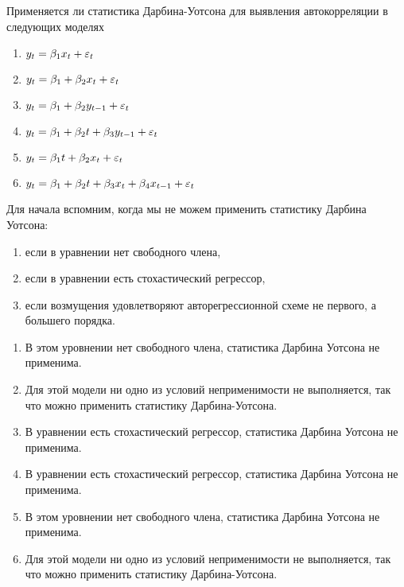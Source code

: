 \begin{problem}
Применяется ли статистика Дарбина-Уотсона для выявления автокорреляции в следующих моделях
\begin{enumerate}
\item $y_t=\beta_1 x_t + \varepsilon_t$
\item $y_t=\beta_1 + \beta_2 x_t + \varepsilon_t$
\item $y_t=\beta_1 + \beta_2 y_{t-1} + \varepsilon_t$
\item $y_t=\beta_1 + \beta_2 t +\beta_3 y_{t-1} + \varepsilon_t$
\item $y_t=\beta_1 t + \beta_2 x_t + \varepsilon_t$
\item $y_t=\beta_1 + \beta_2 t +\beta_3 x_t +\beta_4 x_{t-1} + \varepsilon_t$
\end{enumerate}


\begin{sol}
  Для начала вспомним, когда мы не можем применить статистику Дарбина Уотсона:
  \begin{enumerate}
      \item если в уравнении нет свободного члена,
      \item если в уравнении есть стохастический регрессор,
      \item если возмущения удовлетворяют авторегрессионной схеме не первого, а большего порядка.
  \end{enumerate}
  \begin{enumerate}
    \item В этом уровнении нет свободного члена, статистика Дарбина Уотсона не применима.
   \item Для этой модели ни одно из условий неприменимости не выполняется, так что можно применить статистику Дарбина-Уотсона.
  \item В уравнении есть стохастический регрессор, статистика Дарбина Уотсона не применима.
  \item В уравнении есть стохастический регрессор, статистика Дарбина Уотсона не применима.
  \item В этом уровнении нет свободного члена, статистика Дарбина Уотсона не применима.
  \item Для этой модели ни одно из условий неприменимости не выполняется, так что можно применить статистику Дарбина-Уотсона.
\end{enumerate}
\end{sol}
\end{problem}




